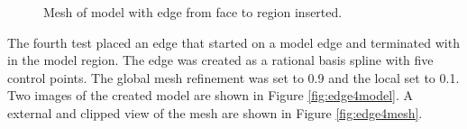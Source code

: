 \documentclass[a4paper, 12pt]{article}
\begin{document}
\begin{figure}[H]
  \centering
  \caption{Mesh of model with edge from face to region inserted.}
  \label{fig:edge3mesh}
\end{figure}

The fourth test placed an edge that started on a model edge and terminated 
with in the model region. 
The edge was created as a rational basis spline with five control points.
The global mesh refinement was set to 0.9 and the local set to 0.1. 
Two images of the created model are shown in Figure \ref{fig:edge4model}.
A external and clipped view of the mesh are
shown in Figure \ref{fig:edge4mesh}.
\end{document}
